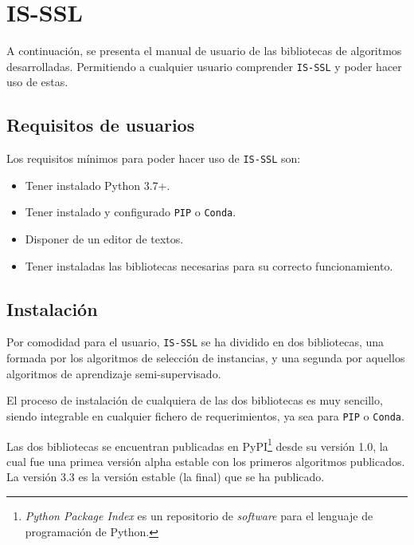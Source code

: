 \FloatBarrier
\clearpage
\section{IS-SSL}
A continuación, se presenta el manual de usuario de las bibliotecas de algoritmos desarrolladas. Permitiendo a cualquier usuario comprender \texttt{IS-SSL} y poder hacer uso de estas.
\subsection{Requisitos de usuarios}
Los requisitos mínimos para poder hacer uso de \texttt{IS-SSL} son:
\begin{itemize}
\item Tener instalado Python 3.7+.
\item Tener instalado y configurado \texttt{PIP} o \texttt{Conda}.
\item Disponer de un editor de textos.
\item Tener instaladas las bibliotecas necesarias para su correcto funcionamiento.
\end{itemize}

\subsection{Instalación}

Por comodidad para el usuario, \texttt{IS-SSL} se ha dividido en dos bibliotecas, una formada por los algoritmos de selección de instancias, y una segunda por aquellos algoritmos de aprendizaje semi-supervisado.

El proceso de instalación de cualquiera de las dos bibliotecas es muy sencillo, siendo integrable en cualquier fichero de requerimientos, ya sea para \texttt{PIP} o \texttt{Conda}.

Las dos bibliotecas se encuentran publicadas en PyPI\footnote{\textit{Python Package Index} es un repositorio de \textit{software} para el lenguaje de programación de Python.} desde su versión 1.0, la cual fue una primea versión alpha estable con los primeros algoritmos publicados. 
La versión 3.3 es la versión estable (la final) que se ha publicado.


